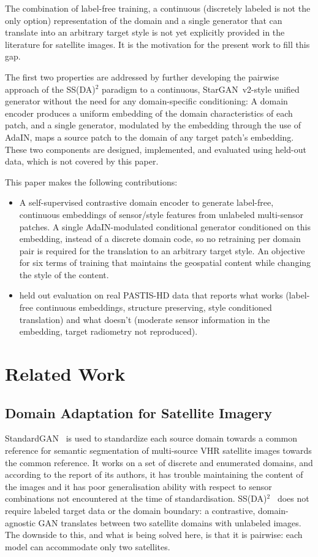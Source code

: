 \documentclass[conference]{IEEEtran}
\begin{document}
The combination of label-free training, a continuous (discretely labeled is not the only option) representation of the domain and a single generator that can translate into an arbitrary target style is not yet explicitly provided in the literature for satellite images. It is the motivation for the present work to fill this gap.

The first two properties are addressed by further developing the pairwise approach of the SS(DA)$^2$ paradigm to a continuous, StarGAN~v2-style unified generator without the need for any domain-specific conditioning: A domain encoder produces a uniform embedding of the domain characteristics of each patch, and a single generator, modulated by the embedding through the use of AdaIN, maps a source patch to the domain of any target patch's embedding. These two components are designed, implemented, and evaluated using held-out data, which is not covered by this paper.

This paper makes the following contributions:
\begin{itemize}
\item A self-supervised contrastive domain encoder to generate label-free, continuous embeddings of sensor/style features from unlabeled multi-sensor patches.
A single AdaIN-modulated conditional generator conditioned on this embedding, instead of a discrete domain code, so no retraining per domain pair is required for the translation to an arbitrary target style.
An objective for six terms of training that maintains the geospatial content while changing the style of the content.
\item held out evaluation on real PASTIS-HD data that reports what works (label-free continuous embeddings, structure preserving, style conditioned translation) and what doesn't (moderate sensor information in the embedding, target radiometry not reproduced).
\end{itemize}

\section{Related Work}

\subsection{Domain Adaptation for Satellite Imagery}
StandardGAN~\cite{tasar2020standardgan} is used to standardize each source domain towards a common reference for semantic segmentation of multi-source VHR satellite images towards the common reference. It works on a set of discrete and enumerated domains, and according to the report of its authors, it has trouble maintaining the content of the images and it has poor generalisation ability with respect to sensor combinations not encountered at the time of standardisation. SS(DA)$^2$~\cite{zhang2023ssdada} does not require labeled target data or the domain boundary: a contrastive, domain-agnostic GAN translates between two satellite domains with unlabeled images. The downside to this, and what is being solved here, is that it is pairwise: each model can accommodate only two satellites.
\end{document}
